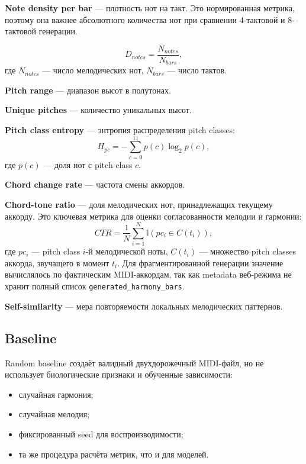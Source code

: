 \textbf{Note density per bar} — плотность нот на такт. Это нормированная метрика, поэтому она важнее абсолютного количества нот при сравнении 4-тактовой и 8-тактовой генерации.

\begin{equation}
D_{notes} = \frac{N_{notes}}{N_{bars}},
\end{equation}
где \(N_{notes}\) — число мелодических нот, \(N_{bars}\) — число тактов.

\textbf{Pitch range} — диапазон высот в полутонах.

\textbf{Unique pitches} — количество уникальных высот.

\textbf{Pitch class entropy} — энтропия распределения pitch classes:
\begin{equation}
H_{pc} = - \sum_{c=0}^{11} p(c)\log_2 p(c),
\end{equation}
где \(p(c)\) — доля нот с pitch class \(c\).

\textbf{Chord change rate} — частота смены аккордов.

\textbf{Chord-tone ratio} — доля мелодических нот, принадлежащих текущему аккорду. Это ключевая метрика для оценки согласованности мелодии и гармонии:
\begin{equation}
CTR = \frac{1}{N}\sum_{i=1}^{N}
\mathbb{I}\left(pc_i \in C(t_i)\right),
\end{equation}
где \(pc_i\) — pitch class \(i\)-й мелодической ноты, \(C(t_i)\) — множество pitch classes аккорда, звучащего в момент \(t_i\). Для фрагментированной генерации значение вычислялось по фактическим MIDI-аккордам, так как metadata веб-режима не хранит полный список \texttt{generated\_harmony\_bars}.

\textbf{Self-similarity} — мера повторяемости локальных мелодических паттернов.

\subsection{Baseline}

Random baseline создаёт валидный двухдорожечный MIDI-файл, но не использует биологические признаки и обученные зависимости:
\begin{itemize}
\item случайная гармония;
\item случайная мелодия;
\item фиксированный seed для воспроизводимости;
\item та же процедура расчёта метрик, что и для моделей.
\end{itemize}

